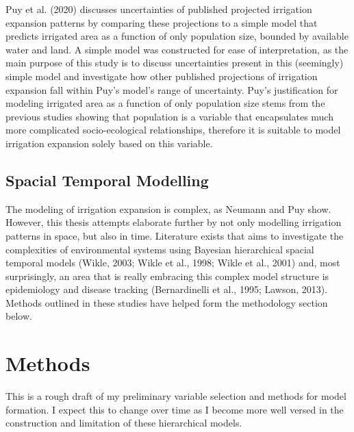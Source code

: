\documentclass[12pt]{extarticle}
\begin{document}
Puy et al. (2020) discusses uncertainties of published projected irrigation expansion patterns by comparing these projections to a simple model that predicts irrigated area as a function of only population size, bounded by available water and land. A simple model was constructed for ease of interpretation, as the main purpose of this study is to discuss uncertainties present in this (seemingly) simple model and investigate how other published projections of irrigation expansion fall within Puy's model's range of uncertainty. Puy's justification for modeling irrigated area as a function of only population size stems from the previous studies showing that population is a variable that encapsulates much more complicated socio-ecological relationships, therefore it is suitable to model irrigation expansion solely based on this variable. 

\subsection{Spacial Temporal Modelling}
The modeling of irrigation expansion is complex, as Neumann and Puy show. However, this thesis attempts elaborate further by not only modelling irrigation patterns in space, but also in time. Literature exists that aims to investigate the complexities of environmental systems using Bayesian hierarchical spacial temporal models (Wikle, 2003; Wikle et al., 1998; Wikle et al., 2001) and, most surprisingly, an area that is really embracing this complex model structure is epidemiology and disease tracking (Bernardinelli et al., 1995; Lawson, 2013). Methods outlined in these studies have helped form the methodology section below. 


\section{Methods}
This is a rough draft of my preliminary variable selection and methods for model formation. I expect this to change over time as I become more well versed in the construction and limitation of these hierarchical models. 
\end{document}
